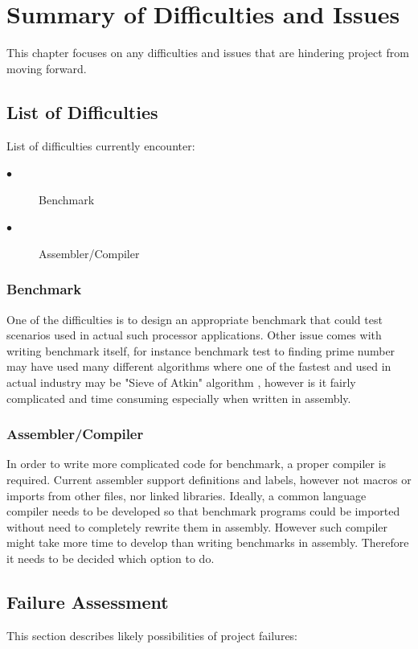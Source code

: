 \documentclass[a4paper,12pt]{article}
\begin{document}
\section{Summary of Difficulties and Issues}
\begin{multicols}{2}
This chapter focuses on any difficulties and issues that are hindering project from moving forward.

\subsection{List of Difficulties}

List of difficulties currently encounter:
\begin{description}
	\item[$\bullet$] Benchmark
	\item[$\bullet$] Assembler/Compiler
\end{description}

\subsubsection{Benchmark}
One of the difficulties is to design an appropriate benchmark that could test scenarios used in actual such processor applications. Other issue comes with writing benchmark itself, for instance benchmark test to finding prime number may have used many different algorithms where one of the fastest and used in actual industry may be "Sieve of Atkin" algorithm \autocite{morain_1989}, however is it fairly complicated and time consuming especially when written in assembly. 

\subsubsection{Assembler/Compiler}
In order to write more complicated code for benchmark, a proper compiler is required. Current assembler support definitions and labels, however not macros or imports from other files, nor linked libraries. Ideally, a common language compiler needs to be developed so that benchmark programs could be imported without need to completely rewrite them in assembly. However such compiler might take more time to develop than writing benchmarks in assembly. Therefore it needs to be decided which option to do.

\subsection{Failure Assessment}
This section describes likely possibilities of project failures:


\end{multicols}
\end{document}
